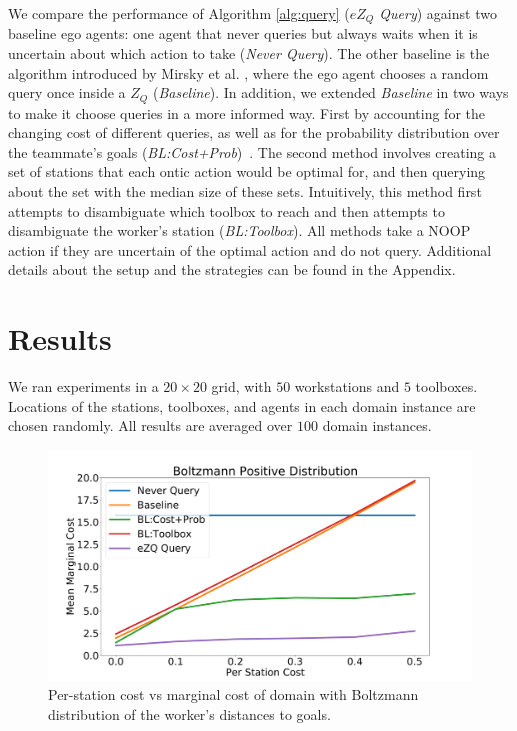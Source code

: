 \documentclass[letterpaper]{article}
\begin{document}
We compare the performance of Algorithm \ref{alg:query} (\emph{$eZ_Q$ Query}) against two baseline ego agents: one agent that never queries but always waits when it is uncertain about which action to take (\emph{Never Query}). The other baseline is the algorithm introduced by Mirsky et al. , where the ego agent chooses a random query once inside a $Z_Q$ (\emph{Baseline}). In addition, we extended \emph{Baseline} in two ways to make it choose queries in a more informed way. First by accounting for the changing cost of different queries, as well as for the probability distribution over the teammate's goals (\emph{BL:Cost+Prob})~\cite{MackeDMAP}. The second method involves creating a set of stations that each ontic action would be optimal for, and then querying about the set with the median size of these sets. Intuitively, this method first attempts to disambiguate which toolbox to reach and then attempts to disambiguate the worker's station  (\emph{BL:Toolbox}). All methods take a NOOP action if they are uncertain of the optimal action and do not query. Additional details about the setup and the strategies can be found in the Appendix.








\section{Results}
We ran experiments in a $20\times 20$ grid, with $50$ workstations and $5$ toolboxes. Locations of the stations, toolboxes, and agents in each domain instance are chosen randomly. All results are averaged over $100$ domain instances.



\begin{figure}[t]
    \centering
    \includegraphics[width=\linewidth]{Figures/CAT_AAAI_BoltzmannPositive.pdf}
    \caption{Per-station cost vs marginal cost of domain with Boltzmann distribution of the worker's distances to goals.}
    \label{fig:dist}
\end{figure}
\end{document}

